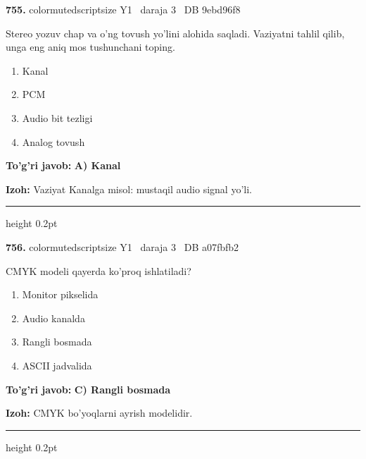 \documentclass[10pt,a4paper,oneside]{article}
\begin{document}
\noindent\textbf{\color{ink}755.}  {color{muted}scriptsize Y1 \textbullet\ daraja 3 \textbullet\ DB 9ebd96f8}
\par
Stereo yozuv chap va o'ng tovush yo'lini alohida saqladi. Vaziyatni tahlil qilib, unga eng aniq mos tushunchani toping.
\begin{enumerate}[label=\Alph*),leftmargin=9mm]
\item Kanal
\item PCM
\item Audio bit tezligi
\item Analog tovush
\end{enumerate}
\begin{tcolorbox}[enhanced,breakable,colback=teal!4,colframe=teal!50!black,boxrule=0.5pt,arc=1.1mm,left=3mm,right=3mm,top=1.7mm,bottom=1.7mm,before skip=2mm,after skip=2mm]
\textbf{\color{teal}To'g'ri javob:} \textbf{A) Kanal}
\par\smallskip
\textbf{Izoh:} Vaziyat Kanalga misol: mustaqil audio signal yo'li.
\end{tcolorbox}
\vspace{2mm}\hrule height 0.2pt \vspace{3mm}

\noindent\textbf{\color{ink}756.}  {color{muted}scriptsize Y1 \textbullet\ daraja 3 \textbullet\ DB a07fbfb2}
\par
CMYK modeli qayerda ko'proq ishlatiladi?
\begin{enumerate}[label=\Alph*),leftmargin=9mm]
\item Monitor pikselida
\item Audio kanalda
\item Rangli bosmada
\item ASCII jadvalida
\end{enumerate}
\begin{tcolorbox}[enhanced,breakable,colback=teal!4,colframe=teal!50!black,boxrule=0.5pt,arc=1.1mm,left=3mm,right=3mm,top=1.7mm,bottom=1.7mm,before skip=2mm,after skip=2mm]
\textbf{\color{teal}To'g'ri javob:} \textbf{C) Rangli bosmada}
\par\smallskip
\textbf{Izoh:} CMYK bo'yoqlarni ayrish modelidir.
\end{tcolorbox}
\vspace{2mm}\hrule height 0.2pt \vspace{3mm}
\end{document}
